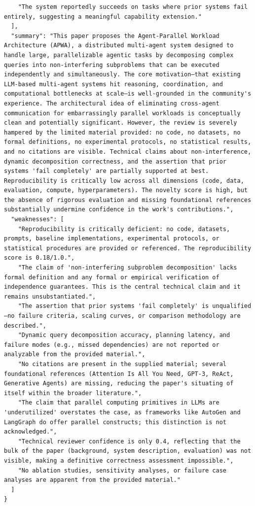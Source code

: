 \documentclass[11pt]{article}
\begin{document}
\begin{verbatim}
    "The system reportedly succeeds on tasks where prior systems fail entirely, suggesting a meaningful capability extension."
  ],
  "summary": "This paper proposes the Agent-Parallel Workload Architecture (APWA), a distributed multi-agent system designed to handle large, parallelizable agentic tasks by decomposing complex queries into non-interfering subproblems that can be executed independently and simultaneously. The core motivation—that existing LLM-based multi-agent systems hit reasoning, coordination, and computational bottlenecks at scale—is well-grounded in the community's experience. The architectural idea of eliminating cross-agent communication for embarrassingly parallel workloads is conceptually clean and potentially significant. However, the review is severely hampered by the limited material provided: no code, no datasets, no formal definitions, no experimental protocols, no statistical results, and no citations are visible. Technical claims about non-interference, dynamic decomposition correctness, and the assertion that prior systems 'fail completely' are partially supported at best. Reproducibility is critically low across all dimensions (code, data, evaluation, compute, hyperparameters). The novelty score is high, but the absence of rigorous evaluation and missing foundational references substantially undermine confidence in the work's contributions.",
  "weaknesses": [
    "Reproducibility is critically deficient: no code, datasets, prompts, baseline implementations, experimental protocols, or statistical procedures are provided or referenced. The reproducibility score is 0.18/1.0.",
    "The claim of 'non-interfering subproblem decomposition' lacks formal definition and any formal or empirical verification of independence guarantees. This is the central technical claim and it remains unsubstantiated.",
    "The assertion that prior systems 'fail completely' is unqualified—no failure criteria, scaling curves, or comparison methodology are described.",
    "Dynamic query decomposition accuracy, planning latency, and failure modes (e.g., missed dependencies) are not reported or analyzable from the provided material.",
    "No citations are present in the supplied material; several foundational references (Attention Is All You Need, GPT-3, ReAct, Generative Agents) are missing, reducing the paper's situating of itself within the broader literature.",
    "The claim that parallel computing primitives in LLMs are 'underutilized' overstates the case, as frameworks like AutoGen and LangGraph do offer parallel constructs; this distinction is not acknowledged.",
    "Technical reviewer confidence is only 0.4, reflecting that the bulk of the paper (background, system description, evaluation) was not visible, making a definitive correctness assessment impossible.",
    "No ablation studies, sensitivity analyses, or failure case analyses are apparent from the provided material."
  ]
}
\end{verbatim}
\end{document}
